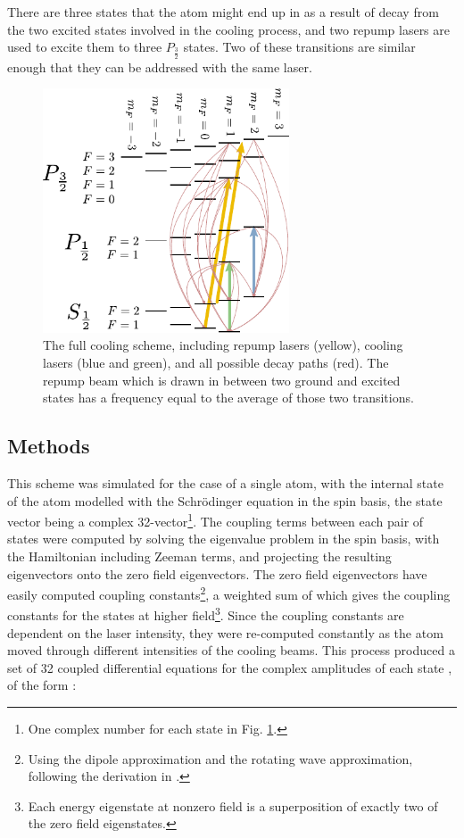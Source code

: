 There are three states that the atom might end up in as a result of decay from the two excited states involved in the cooling process, and two repump lasers are used to excite them to three $P_\frac32$ states. Two of these transitions are similar enough that they can be addressed with the same laser.

\begin{figure}
\begin{center}
\includegraphics[width=0.65\textwidth]{figures/unsorted/cooling_full.pdf}
\caption{\label{fig:cooling_full} The full cooling scheme, including repump lasers (yellow), cooling lasers (blue and green), and all possible decay paths (red). The repump beam which is drawn in between two ground and excited states has a frequency equal to the average of those two transitions. }
\end{center}
\end{figure}

\subsection{Methods}

This scheme was simulated for the case of a single atom, with the internal state of the atom modelled with the Schr\"odinger equation in the spin basis, the state vector being a complex 32-vector\footnote{One complex number for each state in Fig. \ref{fig:cooling_full}.}. The coupling terms between each pair of states were computed by solving the eigenvalue problem in the spin basis, with the Hamiltonian including Zeeman terms, and projecting the resulting eigenvectors onto the zero field eigenvectors. The zero field eigenvectors have easily computed coupling constants\footnote{Using the dipole approximation and the rotating wave approximation, following the derivation in \cite[p 9]{steck_rubidium_2010}.}, a weighted sum of which gives the coupling constants for the states at higher field\footnote{Each energy eigenstate at nonzero field is a superposition of exactly two of the zero field eigenstates.}. Since the coupling constants are dependent on the laser intensity, they were re-computed constantly as the atom moved through different intensities of the cooling beams. This process produced a set of 32 coupled differential equations for the complex amplitudes of each state \cite[p 4]{metcalf_laser_1999}, of the form :

